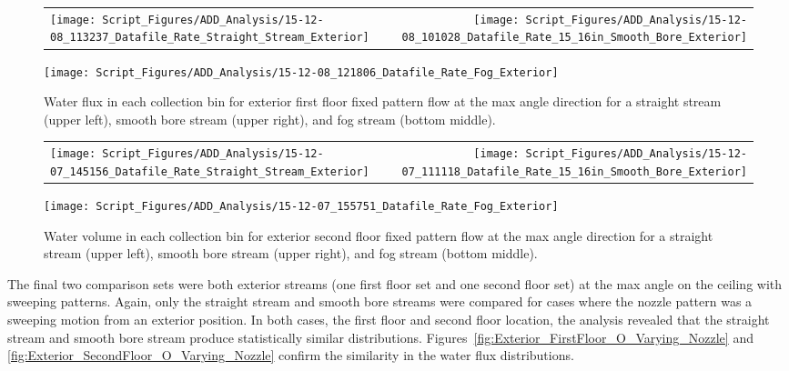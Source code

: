 \documentclass[12pt,oneside]{book}
\begin{document}
\begin{figure}[ht]
\begin{tabular*}{\textwidth}{lr}
\texttt{[image: Script\_Figures/ADD\_Analysis/15-12-08\_113237\_Datafile\_Rate\_Straight\_Stream\_Exterior]} &
\texttt{[image: Script\_Figures/ADD\_Analysis/15-12-08\_101028\_Datafile\_Rate\_15\_16in\_Smooth\_Bore\_Exterior]} \\
\end{tabular*}
\centering
\texttt{[image: Script\_Figures/ADD\_Analysis/15-12-08\_121806\_Datafile\_Rate\_Fog\_Exterior]}
\caption[Water Flux for Varying Exterior First Floor Fixed Pattern Hose Stream Types]{Water flux in each collection bin for exterior first floor fixed pattern flow at the max angle direction for a straight stream (upper left), smooth bore stream (upper right), and fog stream (bottom middle).}
\label{fig:Exterior_FirstFloor_Fixed_Varying_Nozzle}
\end{figure}

\begin{figure}[ht]
\begin{tabular*}{\textwidth}{lr}
\texttt{[image: Script\_Figures/ADD\_Analysis/15-12-07\_145156\_Datafile\_Rate\_Straight\_Stream\_Exterior]} &
\texttt{[image: Script\_Figures/ADD\_Analysis/15-12-07\_111118\_Datafile\_Rate\_15\_16in\_Smooth\_Bore\_Exterior]} \\
\end{tabular*}
\centering
\texttt{[image: Script\_Figures/ADD\_Analysis/15-12-07\_155751\_Datafile\_Rate\_Fog\_Exterior]}
\caption[Water Flux for Varying Exterior Second Floor Fixed Pattern Hose Stream Types]{Water volume in each collection bin for exterior second floor fixed pattern flow at the max angle direction for a straight stream (upper left), smooth bore stream (upper right), and fog stream (bottom middle).}
\label{fig:Exterior_SecondFloor_Fixed_Varying_Nozzle}
\end{figure}

\clearpage

The final two comparison sets were both exterior streams (one first floor set and one second floor set) at the max angle on the ceiling with sweeping patterns. Again, only the straight stream and smooth bore streams were compared for cases where the nozzle pattern was a sweeping motion from an exterior position. In both cases, the first floor and second floor location, the analysis revealed that the straight stream and smooth bore stream produce statistically similar distributions. Figures~\ref{fig:Exterior_FirstFloor_O_Varying_Nozzle} and \ref{fig:Exterior_SecondFloor_O_Varying_Nozzle} confirm the similarity in the water flux distributions.
\end{document}
